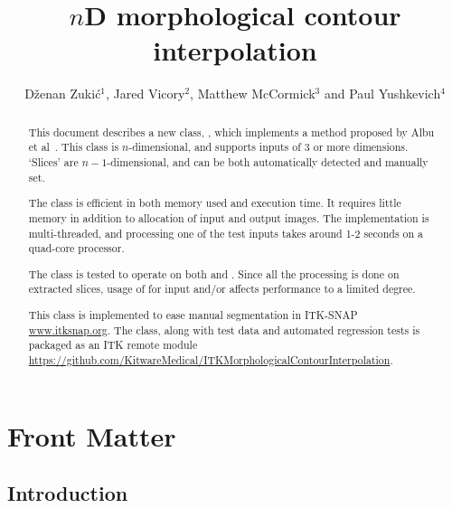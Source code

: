 \documentclass{InsightArticle}
\title{$n$D morphological contour interpolation}
\author{D{\v z}enan Zuki{\' c}$^{1}$, Jared Vicory$^{2}$, Matthew McCormick$^{3}$ and Paul Yushkevich$^{4}$}
\newcommand{\IJhandlerIDnumber}{1338}
\begin{document}
\IJhandlefooter{\IJhandlerIDnumber}

\ifpdf
\else
\fi

\maketitle

\ifhtml
\chapter*{Front Matter\label{front}}
\fi


\begin{abstract}
\noindent
This document describes a new class, ,
which implements a method proposed by Albu et al~\cite{Albu2008}.
This class is $n$-dimensional, and supports inputs of 3 or more dimensions.
`Slices' are $n-1$-dimensional, and can be both automatically detected and manually set.

The class is efficient in both memory used and execution time.
It requires little memory in addition to allocation of input and output images.
The implementation is multi-threaded, and processing one of the test inputs
takes around 1-2 seconds on a quad-core processor.

The class is tested to operate on both  and .
Since all the processing is done on extracted slices,
usage of  for input and/or affects performance to a limited degree.

This class is implemented to ease manual segmentation in ITK-SNAP \url{www.itksnap.org}.
The class, along with test data and automated regression tests is packaged as an ITK
remote module \url{https://github.com/KitwareMedical/ITKMorphologicalContourInterpolation}.
\end{abstract}

\IJhandlenote{\IJhandlerIDnumber}

\tableofcontents


\section{Introduction}
\end{document}
